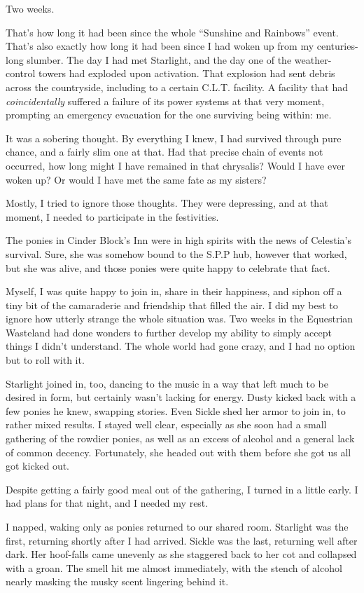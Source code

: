 Two weeks.

That’s how long it had been since the whole “Sunshine and Rainbows” event. That’s also exactly how long it had been since I had woken up from my centuries-long slumber. The day I had met Starlight, and the day one of the weather-control towers had exploded upon activation. That explosion had sent debris across the countryside, including to a certain C.L.T. facility. A facility that had \textit{coincidentally} suffered a failure of its power systems at that very moment, prompting an emergency evacuation for the one surviving being within: me.

It was a sobering thought. By everything I knew, I had survived through pure chance, and a fairly slim one at that. Had that precise chain of events not occurred, how long might I have remained in that chrysalis? Would I have ever woken up? Or would I have met the same fate as my sisters?

Mostly, I tried to ignore those thoughts. They were depressing, and at that moment, I needed to participate in the festivities.

The ponies in Cinder Block’s Inn were in high spirits with the news of Celestia’s survival. Sure, she was somehow bound to the S.P.P hub, however that worked, but she was alive, and those ponies were quite happy to celebrate that fact.

Myself, I was quite happy to join in, share in their happiness, and siphon off a tiny bit of the camaraderie and friendship that filled the air. I did my best to ignore how utterly strange the whole situation was. Two weeks in the Equestrian Wasteland had done wonders to further develop my ability to simply accept things I didn’t understand. The whole world had gone crazy, and I had no option but to roll with it.

Starlight joined in, too, dancing to the music in a way that left much to be desired in form, but certainly wasn’t lacking for energy. Dusty kicked back with a few ponies he knew, swapping stories. Even Sickle shed her armor to join in, to rather mixed results. I stayed well clear, especially as she soon had a small gathering of the rowdier ponies, as well as an excess of alcohol and a general lack of common decency. Fortunately, she headed out with them before she got us all got kicked out.

Despite getting a fairly good meal out of the gathering, I turned in a little early. I had plans for that night, and I needed my rest.

I napped, waking only as ponies returned to our shared room. Starlight was the first, returning shortly after I had arrived. Sickle was the last, returning well after dark. Her hoof-falls came unevenly as she staggered back to her cot and collapsed with a groan. The smell hit me almost immediately, with the stench of alcohol nearly masking the musky scent lingering behind it.

